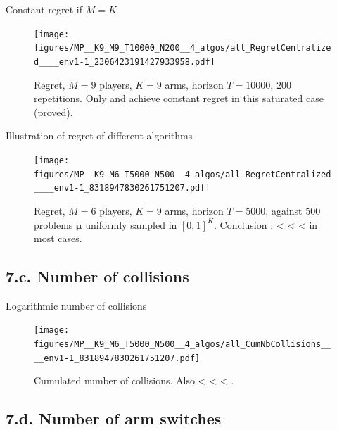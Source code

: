 \documentclass[12pt,english,ignorenonframetext,aspectratio=169,]{beamer}
\begin{document}
\begin{frame}[plain]{Constant regret if \(M=K\)}

\begin{figure}[h!]
\centering
\texttt{[image: figures/MP\_\_K9\_M9\_T10000\_N200\_\_4\_algos/all\_RegretCentralized\_\_\_\_env1-1\_2306423191427933958.pdf]}
\caption{\footnotesize{Regret, $M=9$ players, $K=9$ arms, horizon $T=10000$, $200$ repetitions. Only \textcolor{red}{\RandTopM{}} and \textcolor{yellowgreen}{\MCTopM{}} achieve constant regret in this saturated case (proved).}}
\end{figure}

\end{frame}


\begin{frame}[plain]{Illustration of regret of different algorithms}

\begin{figure}[h!]
\centering
\texttt{[image: figures/MP\_\_K9\_M6\_T5000\_N500\_\_4\_algos/all\_RegretCentralized\_\_\_\_env1-1\_8318947830261751207.pdf]}
\caption{\footnotesize{Regret, $M=6$ players, $K=9$ arms, horizon $T=5000$, against $500$ problems $\boldsymbol{\mu}$ uniformly sampled in $[0,1]^K$. Conclusion : \textcolor{blue}{\rhoRand{}} < \textcolor{red}{\RandTopM{}} < \textcolor{bluegreen}{\Selfish{}} < \textcolor{yellowgreen}{\MCTopM{}} in most cases.}}
\end{figure}

\end{frame}


\subsection{\hfill{}7.c. Number of collisions\hfill{}}

\begin{frame}[plain]{Logarithmic number of collisions}

\begin{figure}[h!]
\centering
\texttt{[image: figures/MP\_\_K9\_M6\_T5000\_N500\_\_4\_algos/all\_CumNbCollisions\_\_\_\_env1-1\_8318947830261751207.pdf]}
\caption{\footnotesize{Cumulated number of collisions. Also \textcolor{blue}{\rhoRand{}} < \textcolor{red}{\RandTopM{}} < \textcolor{bluegreen}{\Selfish{}} < \textcolor{yellowgreen}{\MCTopM{}}.}}
\end{figure}

\end{frame}


\subsection{\hfill{}7.d. Number of arm switches\hfill{}}
\end{document}
